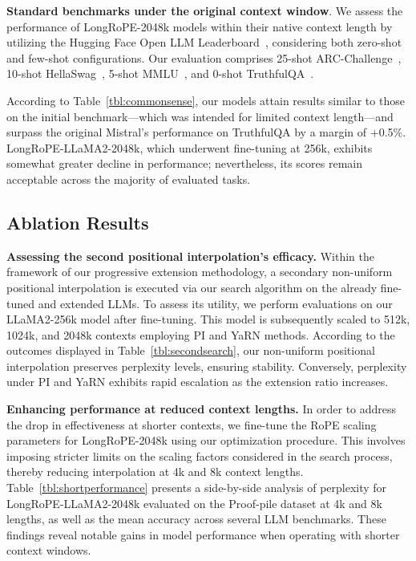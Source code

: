 \textbf{Standard benchmarks under the original context window}. We assess the performance of LongRoPE-2048k models within their native context length by utilizing the Hugging Face Open LLM Leaderboard~\cite{huggingfaceboard}, considering both zero-shot and few-shot configurations. Our evaluation comprises 25-shot ARC-Challenge~\cite{allenai:arc}, 10-shot HellaSwag~\cite{zellers2019hellaswag}, 5-shot MMLU~\cite{mmlu}, and 0-shot TruthfulQA~\cite{lin2021truthfulqa}.

According to Table~\ref{tbl:commonsense}, our models attain results similar to those on the initial benchmark—which was intended for limited context length—and surpass the original Mistral's performance on TruthfulQA by a margin of +0.5\%. LongRoPE-LLaMA2-2048k, which underwent fine-tuning at 256k, exhibits somewhat greater decline in performance; nevertheless, its scores remain acceptable across the majority of evaluated tasks.

\subsection{Ablation Results}

\textbf{Assessing the second positional interpolation's efficacy.} Within the framework of our progressive extension methodology, a secondary non-uniform positional interpolation is executed via our search algorithm on the already fine-tuned and extended LLMs. To assess its utility, we perform evaluations on our LLaMA2-256k model after fine-tuning. This model is subsequently scaled to 512k, 1024k, and 2048k contexts employing PI and YaRN methods. According to the outcomes displayed in Table~\ref{tbl:secondsearch}, our non-uniform positional interpolation preserves perplexity levels, ensuring stability. Conversely, perplexity under PI and YaRN exhibits rapid escalation as the extension ratio increases.

\textbf{Enhancing performance at reduced context lengths.} In order to address the drop in effectiveness at shorter contexts, we fine-tune the RoPE scaling parameters for LongRoPE-2048k using our optimization procedure. This involves imposing stricter limits on the scaling factors considered in the search process, thereby reducing interpolation at 4k and 8k context lengths. Table~\ref{tbl:shortperformance} presents a side-by-side analysis of perplexity for LongRoPE-LLaMA2-2048k evaluated on the Proof-pile dataset at 4k and 8k lengths, as well as the mean accuracy across several LLM benchmarks. These findings reveal notable gains in model performance when operating with shorter context windows.

